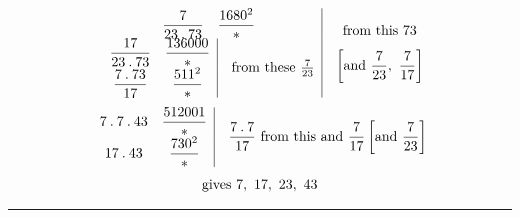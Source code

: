 \par{}%
\[
\begin{array}{c|}
\begin{array}{cc}\dfrac7{23\pdot73}&\dfrac{1680^2}{*}\end{array}\\[4pt]
\begin{array}{cc|}\dfrac{17}{23\pdot73}&\dfrac{136000}{*}\\[4pt]\dfrac{7\pdot73}{17}&\dfrac{511^2}{*}\end{array}\quad\text{from these }\frac7{23}
\end{array}\quad\begin{gathered}\text{from this }73\\[3pt]\left[\text{and }\frac7{23},\ \frac7{17}\right]\end{gathered}
\]
\[
\begin{gathered}
\begin{array}{cc|}7\mathbin{.}7\mathbin{.}43&\dfrac{512001}{*}\\[4pt]17\mathbin{.}43&\dfrac{730^2}{*}\end{array}\quad
\frac{7\mathbin{.}7}{17}\ \text{from this and }\frac7{17}\left[\text{and }\frac7{23}\right]\\[3pt]
\text{gives }7,\ 17,\ 23,\ 43
\end{gathered}
\]\par\medskip\noindent\rule{.32\textwidth}{.3pt}
\newpage
\begingroup\renewcommand{\arraystretch}{2.15}
